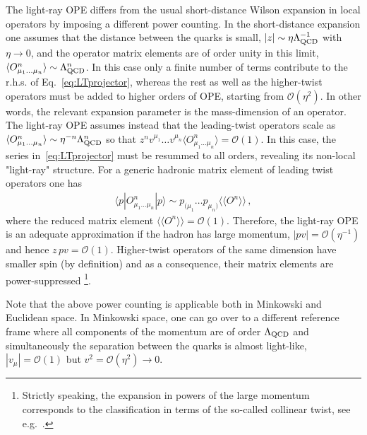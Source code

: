 \documentclass[aps,prd,twocolumn,a4paper,superscriptaddress,10pt,showpacs,notitlepage,floatfix]{revtex4-1}
\begin{document}
The light-ray OPE differs from the usual short-distance Wilson  expansion in local operators by imposing a different power counting. In the short-distance expansion one assumes that the distance between the quarks is small, $|z| \sim \eta \Lambda^{-1}_{\rm QCD}$ with $\eta\to 0$, and the operator matrix elements are of order unity in this limit, $\langle O_{\mu_1\ldots\mu_n}^{n} \rangle \sim \Lambda^{n}_{\rm QCD}$. In this case only a finite number of terms contribute to the r.h.s. of Eq.~\eqref{eq:LTprojector}, whereas the rest as well as the higher-twist operators must be added to 
higher orders of OPE, starting  from $\mathcal{O}(\eta^2)$. In other words, the relevant expansion parameter is the mass-dimension of an operator. 
The light-ray OPE assumes instead that the leading-twist operators scale as $\langle O_{\mu_1\ldots\mu_n}^{n} \rangle \sim \eta^{-n} \Lambda^{n}_{\rm QCD}$ so that $ z^n v^{\mu_1}\ldots v^{\mu_n} \langle O_{\mu_1\ldots\mu_n}^{n} \rangle  = \mathcal{O}(1)$. In this case, the series in~\eqref{eq:LTprojector} must be resummed to all orders, revealing its non-local "light-ray" structure. For a generic hadronic matrix element of leading twist operators one has
\begin{align}
 \langle p | O_{\mu_1\ldots\mu_n}^{n} |p\rangle \sim p_{(\mu_1}\ldots p_{\mu_n)} \langle\!\langle O^{n} \rangle\!\rangle\,, 
\end{align}      
where the reduced matrix element $\langle\!\langle O^{n} \rangle\!\rangle = \mathcal{O}(1)$. Therefore, the light-ray OPE is an adequate approximation if the hadron has large momentum, $|pv| = \mathcal{O}(\eta^{-1})$ and hence $ z\,pv =  \mathcal{O}(1)$. Higher-twist operators of the same dimension have smaller spin (by definition) and as a consequence, their matrix elements are power-suppressed \footnote{Strictly speaking, the expansion in powers of the large momentum corresponds to the classification in terms of the so-called collinear twist, see e.g.~\cite{Geyer:1999uq,Geyer:2000ig}.}.  

Note that the above power counting is applicable both in Minkowski and Euclidean space. In Minkowski space, one can 
go over to a different reference frame where all components of the momentum are of order $\Lambda_{\rm QCD}$ 
and simultaneously the separation between the quarks is almost light-like, $|v_\mu| = \mathcal{O}(1)$ but 
$v^2 = \mathcal{O}(\eta^2) \to 0$. 
\end{document}
